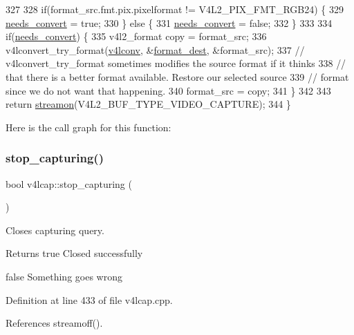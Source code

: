 \begin{DoxyCode}
327 
328     \textcolor{keywordflow}{if}(format\_src.fmt.pix.pixelformat != V4L2\_PIX\_FMT\_RGB24) \{
329         \hyperlink{classv4lcap_acd02d2da6ff03a44a2e155af449144e4}{needs\_convert} = \textcolor{keyword}{true};
330     \} \textcolor{keywordflow}{else} \{
331         \hyperlink{classv4lcap_acd02d2da6ff03a44a2e155af449144e4}{needs\_convert} = \textcolor{keyword}{false};
332     \}
333 
334     \textcolor{keywordflow}{if}(\hyperlink{classv4lcap_acd02d2da6ff03a44a2e155af449144e4}{needs\_convert}) \{
335         v4l2\_format copy = format\_src;
336         v4lconvert\_try\_format(\hyperlink{classv4lcap_a5e57bbf84383d7b42d0cc9d1e7e03abb}{v4lconv}, &\hyperlink{classv4lcap_a51d51cae7bdc2fe6aa5bec4ddbeb6c31}{format\_dest}, &format\_src);
337         \textcolor{comment}{// v4lconvert\_try\_format sometimes modifies the source format if it thinks}
338         \textcolor{comment}{// that there is a better format available. Restore our selected source}
339         \textcolor{comment}{// format since we do not want that happening.}
340         format\_src = copy;
341     \}
342 
343     \textcolor{keywordflow}{return} \hyperlink{classv4lcap_abb1f77b86c0368cd40dab1fb8d4a2565}{streamon}(V4L2\_BUF\_TYPE\_VIDEO\_CAPTURE);
344 \}
\end{DoxyCode}
Here is the call graph for this function\+:
\mbox{\label{classv4lcap_a2992ae4b4fd36da602284c62b97cbeed}} 
\subsubsection{\texorpdfstring{stop\+\_\+capturing()}{stop\_capturing()}}
{\footnotesize\ttfamily bool v4lcap\+::stop\+\_\+capturing (\begin{DoxyParamCaption}{ }\end{DoxyParamCaption})}



Closes capturing query. 

\begin{DoxyReturn}{Returns}
true Closed successfully 

false Something goes wrong 
\end{DoxyReturn}


Definition at line 433 of file v4lcap.\+cpp.



References streamoff().



